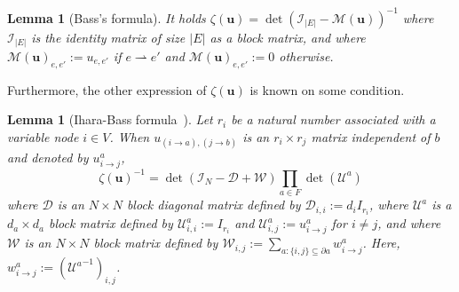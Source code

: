 \documentclass[a4paper,10pt,twoside,twocolumn,openany,final]{memoir}
\theoremstyle{plain}
\newtheorem{lemma}[theorem]{Lemma}
\theoremstyle{definition}
\theoremstyle{remark}
\begin{document}
\begin{lemma}[Bass's formula]
It holds
$\zeta(\bm{u}) = \det(\mathcal{I}_{|E|}-\mathcal{M}(\bm{u}))^{-1}$
where $\mathcal{I}_{|E|}$ is the identity matrix of size $|E|$ as a block matrix,
and where
$\mathcal{M}(\bm{u})_{e, e'} := u_{e, e'}$ if $e\rightharpoonup e'$
and 
$\mathcal{M}(\bm{u})_{e, e'} := 0$ otherwise.
\end{lemma}
Furthermore, the other expression of $\zeta(\bm{u})$ is known on some condition.
\begin{lemma}[Ihara-Bass formula~\cite{watanabe2010thesis}]
Let $r_i$ be a natural number associated with a variable node $i\in V$.
When $u_{(i\to a), (j\to b)}$ is an $r_i\times r_j$ matrix independent of $b$ and denoted by $u_{i\to j}^a$,
\begin{equation*}
\zeta(\bm{u})^{-1} = \det(\mathcal{I}_{N}-\mathcal{D}+\mathcal{W})
\prod_{a \in F} \det(\mathcal{U}^a)
\end{equation*}
where $\mathcal{D}$ is an $N\times N$ block diagonal matrix defined by
$\mathcal{D}_{i,i} := d_i I_{r_i}$, where $\mathcal{U}^a$ is a $d_a\times d_a$ block matrix defined by
$\mathcal{U}^{a}_{i,i} := I_{r_i}$ and
$\mathcal{U}^{a}_{i,j} := u_{i\to j}^a$ for $i\ne j$, 
and where $\mathcal{W}$ is an $N\times N$ block matrix defined by $\mathcal{W}_{i,j}:= \sum_{a: \{i,j\}\subseteq\partial a} w_{i\to j}^a$.
Here, $w_{i\to j}^a := ({\mathcal{U}^{a}}^{-1})_{i,j}$.
\end{lemma}
\end{document}
